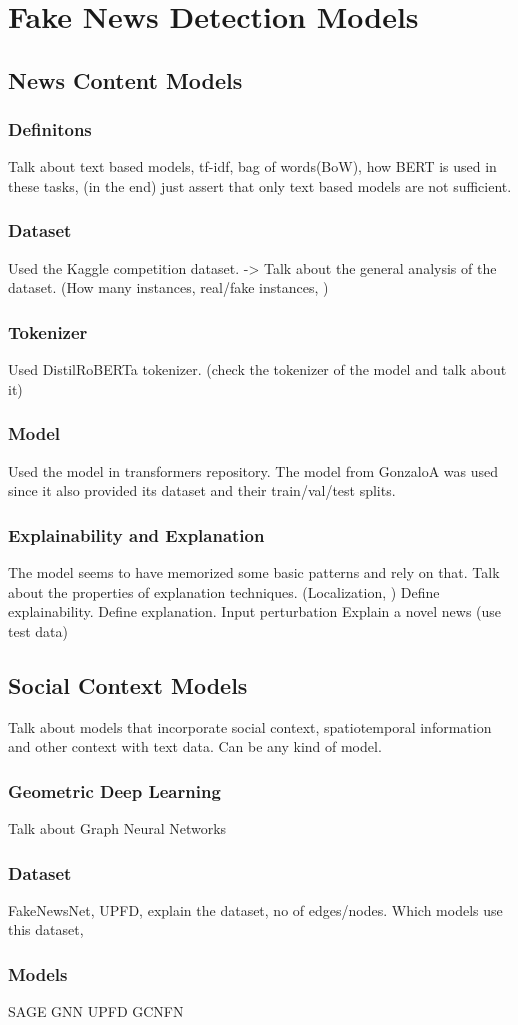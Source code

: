 
\chapter{Fake News Detection Models}\label{chapter:fnd_models}

\section{News Content Models}

\subsection{Definitons}
Talk about text based models, tf-idf, bag of words(BoW), how BERT is used in these tasks, (in the end) just assert that only text based models are not sufficient.

\subsection{Dataset}
Used the Kaggle competition dataset.
-> Talk about the general analysis of the dataset. (How many instances, real/fake instances, )

\subsection{Tokenizer}
Used DistilRoBERTa tokenizer. (check the tokenizer of the model and talk about it)

\subsection{Model}
Used the model in transformers repository. The model from GonzaloA was used since it also provided its dataset and their train/val/test splits.

\subsection{Explainability and Explanation}
The model seems to have memorized some basic patterns and rely on that.
Talk about the properties of explanation techniques. (Localization, )
Define explainability. Define explanation.
Input perturbation
Explain a novel news (use test data)

\section{Social Context Models}
Talk about models that incorporate social context, spatiotemporal information and other context with text data. Can be any kind of model.

\subsection{Geometric Deep Learning}
Talk about Graph Neural Networks

\subsection{Dataset}
FakeNewsNet, UPFD, explain the dataset, no of edges/nodes. Which models use this dataset,

\subsection{Models}
SAGE GNN
UPFD GCNFN
